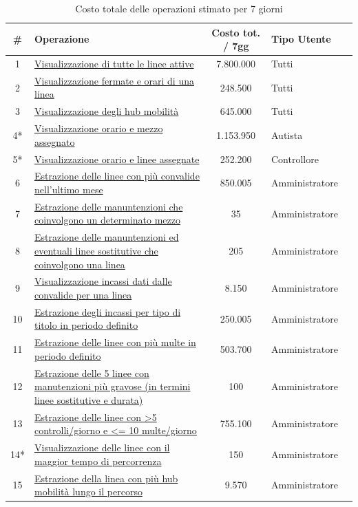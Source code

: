 \documentclass[12pt,a4paper]{report}
\begin{document}
\begin{longtable}{|c|p{8cm}|c|l|l|}
\caption{Costo totale delle operazioni stimato per 7 giorni}
\label{table:operazioni_tot}\\
\hline
\textbf{\#} & \textbf{Operazione} & \textbf{Costo tot. / 7gg} & \textbf{Tipo Utente} \\
\hline
\endhead
1  & \hyperref[op1]{Visualizzazione di tutte le linee attive} & 7.800.000 & Tutti \\
\hline
2 & \hyperref[op2]{Visualizzazione fermate e orari di una linea} & 248.500 & Tutti \\
\hline
3 & \hyperref[op3]{Visualizzazione degli hub mobilità} & 645.000 & Tutti \\
\hline
4* & \hyperref[op4]{Visualizzazione orario e mezzo assegnato} & 1.153.950 & Autista \\
\hline
5* & \hyperref[op5]{Visualizzazione orario e linee assegnate} & 252.200 & Controllore \\
\hline
6 & \hyperref[op6]{Estrazione delle linee con più convalide nell'ultimo mese} & 850.005 & Amministratore  \\
\hline
7 & \hyperref[op7]{Estrazione delle manuntenzioni che coinvolgono un determinato mezzo} & 35 & Amministratore \\
\hline
8 & \hyperref[op8]{Estrazione delle manuntenzioni ed eventuali linee sostitutive che coinvolgono una linea} & 205 & Amministratore \\
\hline
9 & \hyperref[op9]{Visualizzazione incassi dati dalle convalide per una linea} & 8.150 & Amministratore \\
\hline
10 & \hyperref[op10]{Estrazione degli incassi per tipo di titolo in periodo definito} & 250.005 & Amministratore \\
\hline
11 & \hyperref[op11]{Estrazione delle linee con più multe in periodo definito} & 503.700 & Amministratore \\
\hline
12 & \hyperref[op12]{Estrazione delle 5 linee con manutenzioni più gravose (in termini linee sostitutive e durata)} & 100 & Amministratore  \\
\hline
13 & \hyperref[op13]{Estrazione delle linee con \textgreater 5 controlli/giorno e \textless = 10 multe/giorno} & 755.100 & Amministratore  \\
\hline
14* & \hyperref[op14]{Visualizzazione delle linee con il maggior tempo di percorrenza} & 150 & Amministratore  \\
\hline
15 & \hyperref[op15]{Estrazione della linea con più hub mobilità lungo il percorso} & 9.570 & Amministratore \\

\end{longtable}
\end{document}
